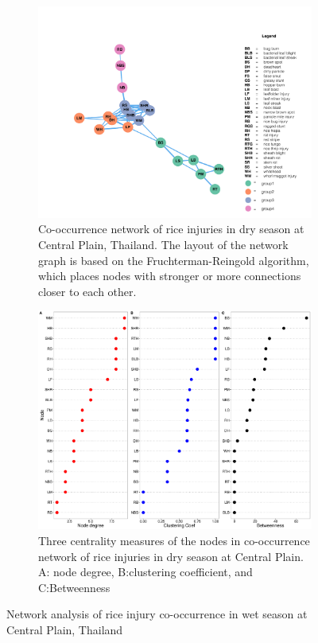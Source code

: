\begin{figure}
    \centering
    \begin{subfigure}[b]{1\textwidth}
        \includegraphics[width = 1\textwidth]{figures/networkCP_ws/networkCP_ws.pdf}
        \caption{Co-occurrence network of rice injuries in dry season at Central Plain, Thailand. The layout of the network graph is based on the Fruchterman-Reingold algorithm, which places nodes with stronger or more connections closer to each other.}
        \label{fig:networkCP_ws}
    \end{subfigure}
    \begin{subfigure}[b]{1\textwidth}
        \includegraphics[width = 1\textwidth]{figures/nodepropCP_ws/nodepropCP_ws.pdf}
        \caption{Three centrality measures of the nodes in co-occurrence network of rice injuries in dry season at Central Plain. A: node degree, B:clustering coefficient, and C:Betweenness}
        \label{fig:nodepropCP_ws}
    \end{subfigure}
    \caption{Network analysis of rice injury co-occurrence in wet season at Central Plain, Thailand}
    \label{fig:CP_ws}
\end{figure}

